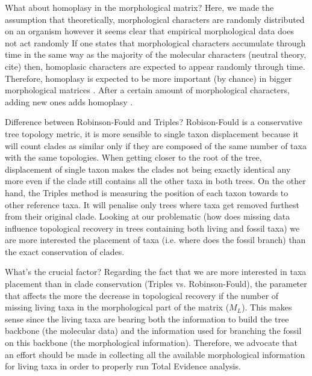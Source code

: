 \documentclass[12pt,letterpaper]{article}
\begin{document}
What about homoplasy in the morphological matrix?
Here, we made the assumption that theoretically, morphological characters are randomly distributed on an organism however it seems clear that empirical morphological data does not act randomly
If one states that morphological characters accumulate through time in the same way as the majority of the molecular characters (neutral theory, cite) then, homoplasic characters are expected to appear randomly through time.
Therefore, homoplasy is expected to be more important (by chance) in bigger morphological matrices \citep{davalosintegrating2014}.
After a certain amount of morphological characters, adding new ones adds homoplasy \citep{wagner2000}.

Difference between Robinson-Fould and Triples?
Robison-Fould is a conservative tree topology metric, it is more sensible to single taxon displacement because it will count clades as similar only if they are composed of the same number of taxa with the same topologies.
When getting closer to the root of the tree, displacement of single taxon makes the clades not being exactly identical any more even if the clade still contains all the other taxa in both trees.
On the other hand, the Triples method is measuring the position of each taxon towards to other reference taxa.
It will penalise only trees where taxa get removed furthest from their original clade.
Looking at our problematic (how does missing data influence topological recovery in trees containing both living and fossil taxa) we are more interested the placement of taxa (i.e. where does the fossil branch) than the exact conservation of clades.

What's the crucial factor?
Regarding the fact that we are more interested in taxa placement than in clade conservation (Triples vs. Robinson-Fould), the parameter that affects the more the decrease in topological recovery if the number of missing living taxa in the morphological part of the matrix ($M_L$).
This makes sense since the living taxa are bearing both the information to build the tree backbone (the molecular data) and the information used for branching the fossil on this backbone (the morphological information).
Therefore, we advocate that an effort should be made in collecting all the available morphological information for living taxa in order to properly run Total Evidence analysis. %



\end{document}
